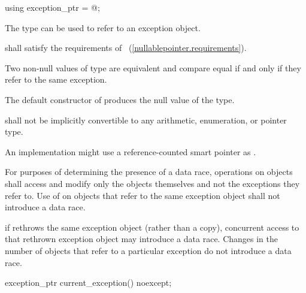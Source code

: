 \begin{itemdecl}
using exception_ptr = @\unspec@;
\end{itemdecl}

\begin{itemdescr}
\pnum
The type  can be used to refer to an exception object.

\pnum
{} shall satisfy the requirements of
~(\ref{nullablepointer.requirements}).

\pnum
Two non-null values of type  are equivalent and compare equal if and
only if they refer to the same exception.

\pnum
The default constructor of  produces the null value of the
type.

\pnum
{} shall not be implicitly convertible to any arithmetic,
enumeration, or pointer type.

\pnum
\begin{note} An implementation might use a reference-counted smart
pointer as . \end{note}

\pnum
For purposes of determining the presence of a data race, operations on
 objects shall access and modify only the
 objects themselves and not the exceptions they refer to.
Use of  on  objects that refer to
the same exception object shall not introduce a data race. \begin{note} if
 rethrows the same exception object (rather than a copy),
concurrent access to that rethrown exception object may introduce a data race.
Changes in the number of  objects that refer to a
particular exception do not introduce a data race. \end{note}
\end{itemdescr}

\begin{itemdecl}
exception_ptr current_exception() noexcept;
\end{itemdecl}

